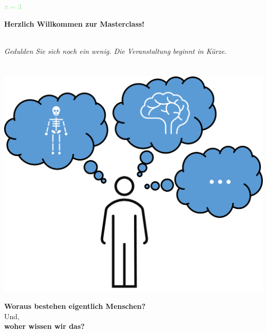 \StartMasterclass

\begin{frame}{\small \hfill \textcolor{lightgreen}{$\pi=3$}}
\, \vspace{0.1cm}  \Large  \begin{center}
    \textbf{Herzlich Willkommen zur Masterclass!} 
\end{center} 
  \small \, \vspace{1cm} \\
    \emph{Gedulden Sie sich noch ein wenig. Die Veranstaltung beginnt in Kürze.}
\end{frame}
\section{}
\begin{frame}
\begin{minipage}[t]{0.4\textwidth}
    \includegraphics[width=\textwidth]{Figures Introductory Lecture/Introduction/Human.png}
\end{minipage}
\begin{minipage}[t]{0.55\textwidth}
   \vspace{-3cm} \centering
     \Large{ \textbf{Woraus bestehen eigentlich Menschen?}} \\ \vspace{0.5cm} \normalsize{Und,} \\ \Large \textbf{woher wissen wir das?} %
\end{minipage}  
\end{frame}
